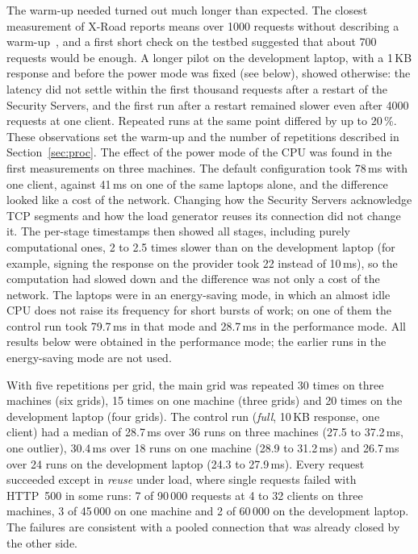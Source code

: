 \documentclass[conference,a4paper]{IEEEtran}
\begin{document}
The warm-up needed turned out much longer than expected. The closest measurement of X-Road reports
means over 1000 requests without describing a warm-up~\cite{bakhtina2026ijis}, and a first short
check on the testbed suggested that about 700 requests would be enough. A longer pilot on the
development laptop, with a 1\,KB response and before the power mode was fixed (see below), showed
otherwise: the latency did not settle within the first thousand requests after a restart of the
Security Servers, and the first run after a restart remained slower even after 4000 requests at one
client. Repeated runs at the same
point differed by up to 20\,\%. These observations set the warm-up and the number of repetitions
described in Section~\ref{sec:proc}.
The effect of the power mode of the CPU was found in the first measurements on three machines. The default
configuration took 78\,ms with one client, against 41\,ms on one of the same laptops alone, and the
difference looked like a cost of the network. Changing how the Security Servers acknowledge TCP
segments and how the load generator reuses its connection did not change it. The per-stage timestamps
then showed all stages, including purely computational ones, 2 to 2.5 times slower than on the
development laptop (for example, signing the response on the provider took 22 instead of 10\,ms), so
the computation had slowed down and the difference was not only a cost of the network. The laptops were in an energy-saving mode, in
which an almost idle CPU does not raise its frequency for short bursts of work; on one of them the
control run took 79.7\,ms in that mode and 28.7\,ms in the performance mode. All results below were
obtained in the performance mode; the earlier runs in the energy-saving mode are not used.

With five repetitions per grid, the main grid was repeated 30 times on three machines (six grids), 15
times on one machine (three grids) and 20 times on the development laptop (four grids). The control run (\emph{full}, 10\,KB response, one
client) had a median of 28.7\,ms over 36 runs on three machines (27.5 to 37.2\,ms, one outlier),
30.4\,ms over 18 runs on one machine (28.9 to 31.2\,ms) and 26.7\,ms over 24 runs on the development
laptop (24.3 to 27.9\,ms). Every request succeeded except in \emph{reuse} under load, where single
requests failed with HTTP~500 in some runs: 7 of 90\,000 requests at 4 to 32 clients on three
machines, 3 of 45\,000 on one machine and 2 of 60\,000 on the development laptop. The failures are
consistent with a pooled connection that was already closed by the other side.
\end{document}
